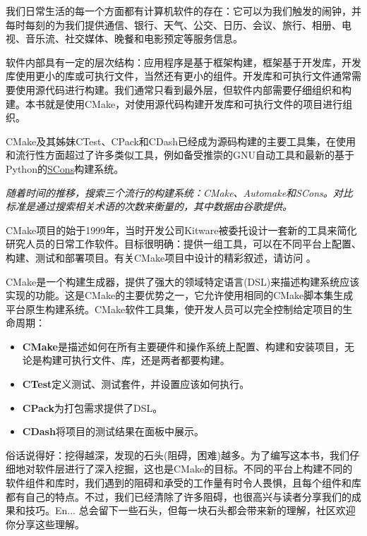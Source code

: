 我们日常生活的每一个方面都有计算机软件的存在：它可以为我们触发的闹钟，并每时每刻的为我们提供通信、银行、天气、公交、日历、会议、旅行、相册、电视、音乐流、社交媒体、晚餐和电影预定等服务信息。

软件内部具有一定的层次结构：应用程序是基于框架构建，框架基于开发库，开发库使用更小的库或可执行文件，当然还有更小的组件。开发库和可执行文件通常需要使用源代码进行构建。我们通常只看到最外层，但软件内部需要仔细组织和构建。本书就是使用CMake，对使用源代码构建开发库和可执行文件的项目进行组织。

CMake及其姊妹CTest、CPack和CDash已经成为源码构建的主要工具集，在使用和流行性方面超过了许多类似工具，例如备受推崇的GNU自动工具和最新的基于Python的\href{https://www.scons.org/}{SCons}构建系统。


\emph{随着时间的推移，搜索三个流行的构建系统：CMake、Automake和SCons。对比标准是通过搜索相关术语的次数来衡量的，其中数据由谷歌提供。}

CMake项目的始于1999年，当时开发公司Kitware被委托设计一套新的工具来简化研究人员的日常工作软件。目标很明确：提供一组工具，可以在不同平台上配置、构建、测试和部署项目。有关CMake项目中设计的精彩叙述，请访问  。

CMake是一个构建生成器，提供了强大的领域特定语言(DSL)来描述构建系统应该实现的功能。这是CMake的主要优势之一，它允许使用相同的CMake脚本集生成平台原生构建系统。CMake软件工具集，使开发人员可以完全控制给定项目的生命周期：

\begin{itemize}
\item \textbf{CMake}是描述如何在所有主要硬件和操作系统上配置、构建和安装项目，无论是构建可执行文件、库，还是两者都要构建。

\item \textbf{CTest}定义测试、测试套件，并设置应该如何执行。

\item \textbf{CPack}为打包需求提供了DSL。

\item \textbf{CDash}将项目的测试结果在面板中展示。

\end{itemize}

俗话说得好：挖得越深，发现的石头(阻碍，困难)越多。为了编写这本书，我们仔细地对软件层进行了深入挖掘，这也是CMake的目标。不同的平台上构建不同的软件组件和库时，我们遇到的阻碍和承受的工作量有时令人畏惧，且每个组件和库都有自己的特点。不过，我们已经清除了许多阻碍，也很高兴与读者分享我们的成果和技巧。En... 总会留下一些石头，但每一块石头都会带来新的理解，社区欢迎你分享这些理解。


